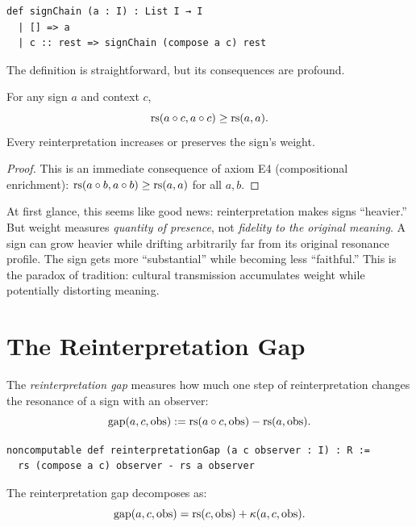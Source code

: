\begin{lstlisting}
def signChain (a : I) : List I → I
  | [] => a
  | c :: rest => signChain (compose a c) rest
\end{lstlisting}

The definition is straightforward, but its consequences are profound.

\begin{theorem}
\label{thm:sign-weight-growth}
For any sign $a$ and context $c$,
\[
  \mathrm{rs}(a \circ c, a \circ c) \geq \mathrm{rs}(a, a).
\]
Every reinterpretation increases or preserves the sign's weight.
\end{theorem}

\begin{proof}
This is an immediate consequence of axiom E4 (compositional enrichment):
$\mathrm{rs}(a \circ b, a \circ b) \geq \mathrm{rs}(a, a)$ for all $a, b$.
\end{proof}

\begin{remark}
At first glance, this seems like good news: reinterpretation makes signs
``heavier.''  But weight measures \emph{quantity of presence}, not
\emph{fidelity to the original meaning}.  A sign can grow heavier while
drifting arbitrarily far from its original resonance profile.  The sign
gets more ``substantial'' while becoming less ``faithful.''  This is the
paradox of tradition: cultural transmission accumulates weight while
potentially distorting meaning.
\end{remark}

\section{The Reinterpretation Gap}

\begin{definition}
The \emph{reinterpretation gap} measures how much one step of
reinterpretation changes the resonance of a sign with an observer:
\[
  \mathrm{gap}(a, c, \mathrm{obs}) := \mathrm{rs}(a \circ c, \mathrm{obs}) - \mathrm{rs}(a, \mathrm{obs}).
\]
\end{definition}

\begin{lstlisting}
noncomputable def reinterpretationGap (a c observer : I) : R :=
  rs (compose a c) observer - rs a observer
\end{lstlisting}

\begin{theorem}
\label{thm:gap-decomp}
The reinterpretation gap decomposes as:
\[
  \mathrm{gap}(a, c, \mathrm{obs}) = \mathrm{rs}(c, \mathrm{obs}) + \kappa(a, c, \mathrm{obs}).
\]
\end{theorem}


